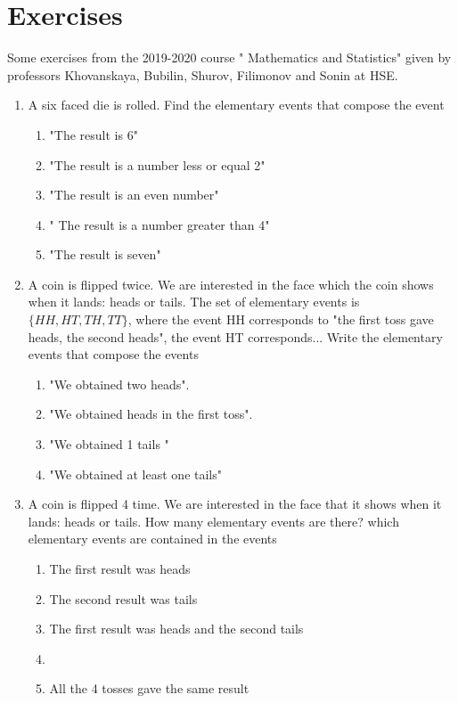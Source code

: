 \documentclass[reqno]{amsart}
\newcommand{\<}{{\langle \!\! \langle}}
\renewcommand{\>}{{\rangle \!\! \rangle}}
\begin{document}
\section{Exercises}
Some exercises from the 2019-2020 course " Mathematics and Statistics" given by  professors 
Khovanskaya, Bubilin, Shurov, Filimonov and Sonin at HSE. 
\begin{enumerate}
    
    \item A six faced die is rolled. Find the elementary events that compose the event
    \begin{enumerate}
        \item "The result is 6"
        \item "The result is a number less or equal 2"
        \item "The result is an even number"
        \item " The result is a number greater than 4"
        \item "The result is seven"
        
    \end{enumerate}
    
    \item  A coin is flipped twice. We are interested in the face which the coin shows when it lands: heads or tails. The set of elementary events is $\{ HH, HT,TH,TT\}$, where the event HH corresponds to "the first toss gave heads, the second heads", the event HT corresponds... Write the elementary events that compose the events
    \begin{enumerate}
          \item "We obtained two heads".
          \item "We obtained heads in the first toss".
          \item "We obtained 1 tails "
          \item "We obtained at least one tails"
          
    \end{enumerate}
    
    \item A coin is flipped 4 time. We are interested in the face that it shows when it lands: heads or tails. How many elementary events are there? which elementary events are contained in the events 
    
    
    \begin{enumerate}
       \item The first result was heads
       \item The second result was tails
       \item The first result was heads and the second tails 
       \item 
       \item All the 4 tosses gave the same result
    \end{enumerate}
    
    
\end{enumerate}
\end{document}
